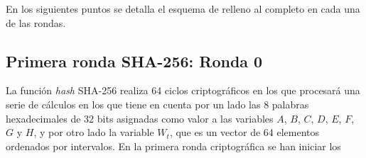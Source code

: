 \documentclass{article}
\begin{document}
        En los siguientes puntos se detalla el esquema de relleno al completo en cada una de las rondas.
        
        \subsection{Primera ronda SHA-256: Ronda 0}
        La función \textit{hash} SHA-256 realiza 64 ciclos criptográficos en los que procesará una serie de cálculos en los que tiene en cuenta por un lado las 8 palabras hexadecimales de 32 bits asignadas como valor a las variables $A$, $B$, $C$, $D$, $E$, $F$, $G$ y $H$, y por otro lado la variable $W_t$, que es un vector de 64 elementos ordenados por intervalos. En la primera ronda criptográfica se han iniciar los
        
        \vspace{3mm}
        
\end{document}
